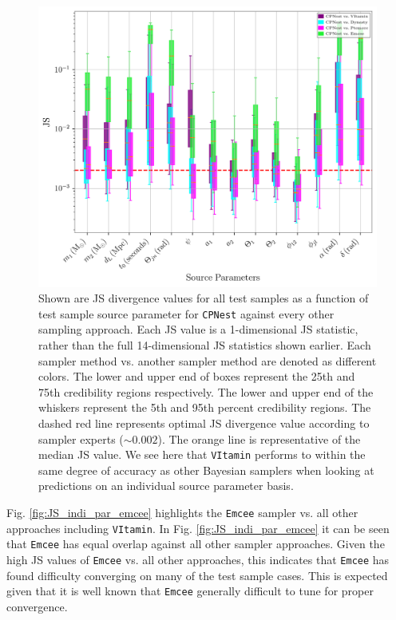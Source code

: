 \begin{figure}
    \includegraphics[width=\columnwidth]{figures/JS_IndiPar_cpnest_nature_paper.png}
    \caption[JS divergences of individual source parameters for \texttt{CPNest} against all other approaches.]{\label{fig:JS_indi_par_cpnest} Shown are JS divergence values for all test samples as a function of test sample source parameter for \texttt{CPNest} against every other sampling approach. Each JS value is a 1-dimensional JS statistic, rather than the full 14-dimensional JS statistics shown earlier. Each sampler method vs. another sampler method are denoted as different colors. The lower and upper end of boxes represent the 25th and 75th credibility regions respectively. The lower and upper end of the whiskers represent the 5th and 95th percent credibility regions. The dashed red line represents optimal JS divergence value according to sampler experts ($\sim 0.002$). The orange line is representative of the median JS value. We see here that \texttt{VItamin} performs to within the same degree of accuracy as other Bayesian samplers when looking at predictions on an individual source parameter basis.}
\end{figure}

%
%

Fig. \ref{fig:JS_indi_par_emcee} highlights the \texttt{Emcee} sampler 
vs. all other approaches including \texttt{VItamin}. In Fig. 
\ref{fig:JS_indi_par_emcee} it can be seen that \texttt{Emcee} has equal 
overlap against all other sampler approaches. Given the high JS values 
of \texttt{Emcee} vs. all other approaches, this indicates that \texttt{Emcee} 
has found difficulty converging on many of the test sample cases. This is 
expected given that it is well known that \texttt{Emcee} generally difficult 
to tune for proper convergence.

